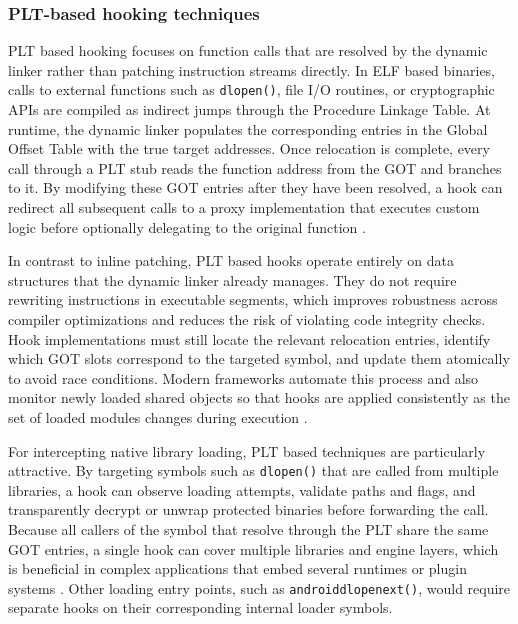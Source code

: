 \documentclass[11pt,a4paper]{report}
\renewcommand\_{{\textunderscore\allowbreak}}
\begin{document}
\subsubsection{PLT-based hooking techniques}

PLT based hooking focuses on function calls that are resolved by the dynamic linker rather than patching instruction streams directly. In ELF based binaries, calls to external functions such as \texttt{dlopen()}, file I/O routines, or cryptographic APIs are compiled as indirect jumps through the Procedure Linkage Table. At runtime, the dynamic linker populates the corresponding entries in the Global Offset Table with the true target addresses. Once relocation is complete, every call through a PLT stub reads the function address from the GOT and branches to it. By modifying these GOT entries after they have been resolved, a hook can redirect all subsequent calls to a proxy implementation that executes custom logic before optionally delegating to the original function \cite{xinuos2025elf,ronin2018hooking}.

In contrast to inline patching, PLT based hooks operate entirely on data structures that the dynamic linker already manages. They do not require rewriting instructions in executable segments, which improves robustness across compiler optimizations and reduces the risk of violating code integrity checks. Hook implementations must still locate the relevant relocation entries, identify which GOT slots correspond to the targeted symbol, and update them atomically to avoid race conditions. Modern frameworks automate this process and also monitor newly loaded shared objects so that hooks are applied consistently as the set of loaded modules changes during execution \cite{ronin2018hooking,pizzi2022virtualpatch}.

For intercepting native library loading, PLT based techniques are particularly attractive. By targeting symbols such as \texttt{dlopen()} that are called from multiple libraries, a hook can observe loading attempts, validate paths and flags, and transparently decrypt or unwrap protected binaries before forwarding the call. Because all callers of the symbol that resolve through the PLT share the same GOT entries, a single hook can cover multiple libraries and engine layers, which is beneficial in complex applications that embed several runtimes or plugin systems \cite{ronin2018hooking,pizzi2022virtualpatch}. Other loading entry points, such as \texttt{android\_dlopen\_ext()}, would require separate hooks on their corresponding internal loader symbols.
\end{document}
